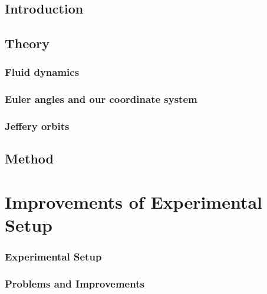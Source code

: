 \documentclass[]{report}
\begin{document}


\doublespacing



\newpage
{}
\setcounter{page}{1}
\pagestyle{fancy}
\setspecialhdr
\tableofcontents


\newpage
\setdefaulthdr
{}	
\setcounter{page}{1}

\chapter{Introduction}



\chapter{Theory}


\section{Fluid dynamics}


\section{Euler angles and our coordinate system}


\section{Jeffery orbits}


\chapter{Method}
\part{Improvements of Experimental Setup}
\section{Experimental Setup}

\section{Problems and Improvements}

\end{document}
